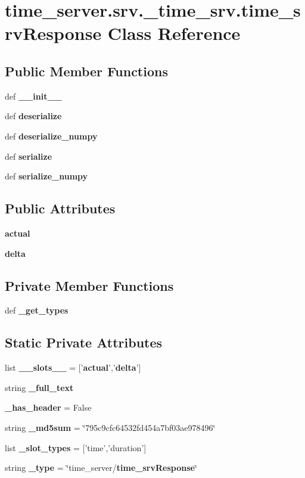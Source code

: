\section{time\-\_\-server.\-srv.\-\_\-time\-\_\-srv.\-time\-\_\-srv\-Response \-Class \-Reference}
\label{classtime__server_1_1srv_1_1__time__srv_1_1time__srvResponse}
\subsection*{\-Public \-Member \-Functions}
\begin{DoxyCompactItemize}
\item 
def {\bf \-\_\-\-\_\-init\-\_\-\-\_\-}
\item 
def {\bf deserialize}
\item 
def {\bf deserialize\-\_\-numpy}
\item 
def {\bf serialize}
\item 
def {\bf serialize\-\_\-numpy}
\end{DoxyCompactItemize}
\subsection*{\-Public \-Attributes}
\begin{DoxyCompactItemize}
\item 
{\bf actual}
\item 
{\bf delta}
\end{DoxyCompactItemize}
\subsection*{\-Private \-Member \-Functions}
\begin{DoxyCompactItemize}
\item 
def {\bf \-\_\-get\-\_\-types}
\end{DoxyCompactItemize}
\subsection*{\-Static \-Private \-Attributes}
\begin{DoxyCompactItemize}
\item 
list {\bf \-\_\-\-\_\-slots\-\_\-\-\_\-} = ['{\bf actual}','{\bf delta}']
\item 
string {\bf \-\_\-full\-\_\-text}
\item 
{\bf \-\_\-has\-\_\-header} = \-False
\item 
string {\bf \-\_\-md5sum} = \char`\"{}795c9cfc64532fd454a7bf03ae978496\char`\"{}
\item 
list {\bf \-\_\-slot\-\_\-types} = ['time','duration']
\item 
string {\bf \-\_\-type} = \char`\"{}time\-\_\-server/{\bf time\-\_\-srv\-Response}\char`\"{}
\end{DoxyCompactItemize}


